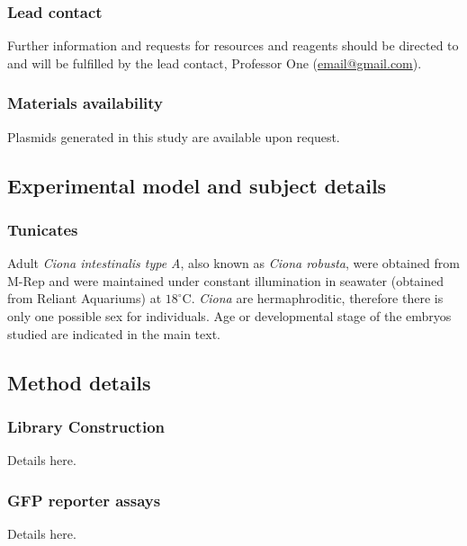 \subsubsection{Lead contact} 
Further information and requests for resources and reagents should be directed to and will be fulfilled by the lead contact, Professor One (\href{mailto:email@gmail.com}{email@gmail.com}). 

\subsubsection{Materials availability} 
Plasmids generated in this study are available upon request. 

\subsection{Experimental model and subject details}
\subsubsection{Tunicates}
Adult \textit{\textit{Ciona} intestinalis type A}, also known as \textit{\textit{Ciona} robusta}, were obtained from M-Rep and were maintained under constant illumination in seawater (obtained from Reliant Aquariums) at $18^\circ$C. \textit{Ciona} are hermaphroditic, therefore there is only one possible sex for individuals. Age or developmental stage of the embryos studied are indicated in the main text. 

\subsection{Method details}
\subsubsection{Library Construction}
Details here.

\subsubsection{GFP reporter assays}
Details here.


